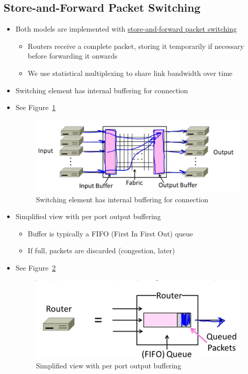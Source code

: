 \documentclass[12pt]{ctexart}   %
\begin{document}
	\subsection{Store-and-Forward Packet Switching}
	\begin{itemize}
		\item Both models are implemented with \underline{store-and-forward packet switching}
		\begin{itemize}
			\item Routers receive a complete packet, storing it temporarily if necessary before forwarding it onwards
			\item We use statistical multiplexing to share link bandwidth over time
		\end{itemize}
		
		\item Switching element has internal buffering for connection
		\item See Figure~\ref{fig:4-2-1}
		
		\begin{figure}[h!] %
		\centering
		 \includegraphics[scale=0.7]{images/4-2-1}
		\caption{ Switching element has internal buffering for connection }
		 \label{fig:4-2-1}
		 \end{figure}
		 
		 \item Simplified view with per port output buffering
		 \begin{itemize}
		 	\item Buffer is typically a FIFO (First In First Out) queue
		 	\item If full, packets are discarded (congestion, later)
		 \end{itemize}
		 \item See Figure~\ref{fig:4-2-2}
		
		\begin{figure}[h!] %
		\centering
		 \includegraphics[scale=0.7]{images/4-2-2}
		\caption{ Simplified view with per port output buffering }
		 \label{fig:4-2-2}
		 \end{figure}
	\end{itemize}
	
\end{document}
